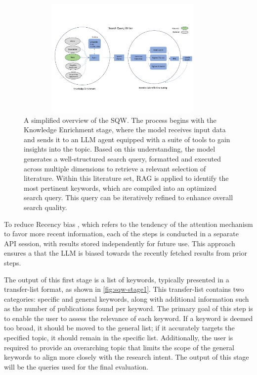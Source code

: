 \begin{figure}[!h]
	\centering
	\includegraphics[height=220px, width=400px]{pics/sqw-overview.pdf}
	\caption[Search Query Writer]{A simplified overview of the SQW. The process begins with the Knowledge Enrichment stage, where the model receives input data and sends it to an LLM agent equipped with a suite of tools to gain insights into the topic. Based on this understanding, the model generates a well-structured search query, formatted and executed across multiple dimensions to retrieve a relevant selection of literature. Within this literature set, RAG is applied to identify the most pertinent keywords, which are compiled into an optimized search query. This query can be iteratively refined to enhance overall search quality.}
	\label{fig:sqw-overview}
\end{figure}

To reduce Recency bias \autocite{Deldjoo2024}, which refers to the tendency of the attention mechanism to favor more recent information, each of the steps is conducted in a separate API session, with results stored independently for future use. This approach ensures a that the LLM is biased towards the recently fetched results from prior steps.

The output of this first stage is a list of keywords, typically presented in a transfer-list format, as shown in \autoref{fig:sqw-stage1}. This transfer-list contains two categories: specific and general keywords, along with additional information such as the number of publications found per keyword. The primary goal of this step is to enable the user to assess the relevance of each keyword. If a keyword is deemed too broad, it should be moved to the general list; if it accurately targets the specified topic, it should remain in the specific list. Additionally, the user is required to provide an overarching topic that limits the scope of the general keywords to align more closely with the research intent. The output of this stage will be the queries used for the final evaluation.

